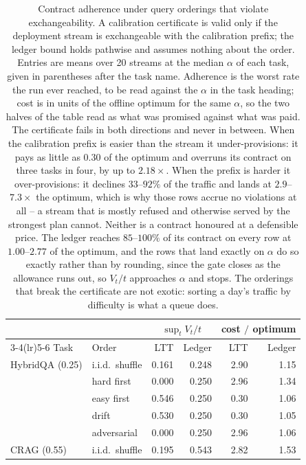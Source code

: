 \begin{table}[t]
\centering
\caption{Contract adherence under query orderings that violate exchangeability. A calibration certificate is valid only if the deployment stream is exchangeable with the calibration prefix; the ledger bound holds pathwise and assumes nothing about the order. Entries are means over 20 streams at the median $\alpha$ of each task, given in parentheses after the task name. Adherence is the worst rate the run ever reached, to be read against the $\alpha$ in the task heading; cost is in units of the offline optimum for the same $\alpha$, so the two halves of the table read as what was promised against what was paid. The certificate fails in both directions and never in between. When the calibration prefix is easier than the stream it under-provisions: it pays as little as $0.30$ of the optimum and overruns its contract on three tasks in four, by up to $2.18\times$. When the prefix is harder it over-provisions: it declines $33$--$92\%$ of the traffic and lands at $2.9$--$7.3\times$ the optimum, which is why those rows accrue no violations at all -- a stream that is mostly refused and otherwise served by the strongest plan cannot. Neither is a contract honoured at a defensible price. The ledger reaches $85$--$100\%$ of its contract on every row at $1.00$--$2.77$ of the optimum, and the rows that land exactly on $\alpha$ do so exactly rather than by rounding, since the gate closes as the allowance runs out, so $V_t/t$ approaches $\alpha$ and stops. The orderings that break the certificate are not exotic: sorting a day's traffic by difficulty is what a queue does.}
\label{tab:orders}
\footnotesize
\setlength{\tabcolsep}{4pt}
\begin{tabular}{llrrrr}
\toprule
 & & \multicolumn{2}{c}{$\sup_t V_t/t$} & \multicolumn{2}{c}{cost $/$ optimum} \\
\cmidrule(lr){3-4}\cmidrule(lr){5-6}
Task & Order & LTT & Ledger & LTT & Ledger \\
\midrule
HybridQA (0.25) & i.i.d.\ shuffle & 0.161 & 0.248 & 2.90 & 1.15 \\
 & hard first & 0.000 & 0.250 & 2.96 & 1.34 \\
 & easy first & 0.546 & 0.250 & 0.30 & 1.06 \\
 & drift & 0.530 & 0.250 & 0.30 & 1.05 \\
 & adversarial & 0.000 & 0.250 & 2.96 & 1.06 \\
\addlinespace[2pt]
CRAG (0.55) & i.i.d.\ shuffle & 0.195 & 0.543 & 2.82 & 1.53 \\

\end{tabular}
\end{table}
